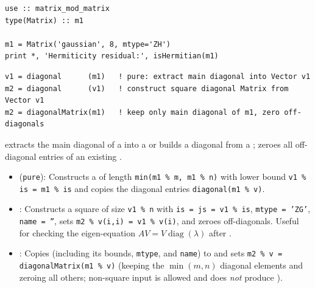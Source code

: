 \begin{description}[leftmargin=2.2cm, style=nextline]
\end{description}

\lstset{language=[95]Fortran}
\begin{lstlisting}
use :: matrix_mod_matrix
type(Matrix) :: m1

m1 = Matrix('gaussian', 8, mtype='ZH')
print *, 'Hermiticity residual:', isHermitian(m1)
\end{lstlisting}


\lstset{language=[95]Fortran}
\begin{lstlisting}
v1 = diagonal      (m1)   ! pure: extract main diagonal into Vector v1
m2 = diagonal      (v1)   ! construct square diagonal Matrix from Vector v1
m2 = diagonalMatrix(m1)   ! keep only main diagonal of m1, zero off-diagonals
\end{lstlisting}

 extracts the main diagonal of a  into a  or builds a diagonal  from a ;  zeroes all off-diagonal entries of an existing .

\begin{itemize}
  \item {} (\texttt{pure}): Constructs a  of length \texttt{min(m1 \% m, m1 \% n)} with lower bound \texttt{v1 \% is = m1 \% is} and copies the diagonal entries \texttt{diagonal(m1 \% v)}.
  \item {}: Constructs a square  of size \texttt{v1 \% n} with \texttt{is = js = v1 \% is}, \texttt{mtype = 'ZG'}, \texttt{name = ''}, sets \texttt{m2 \% v(i,i) = v1 \% v(i)}, and zeroes off-diagonals. Useful for checking the eigen-equation $A V = V \operatorname{diag}(\lambda)$ after .
  \item {}: Copies  (including its bounds, \texttt{mtype}, and \texttt{name}) to  and sets \texttt{m2 \% v = diagonalMatrix(m1 \% v)} (keeping the $\min(m,n)$ diagonal elements and zeroing all others; non-square input is allowed and does \emph{not} produce ).
\end{itemize}

